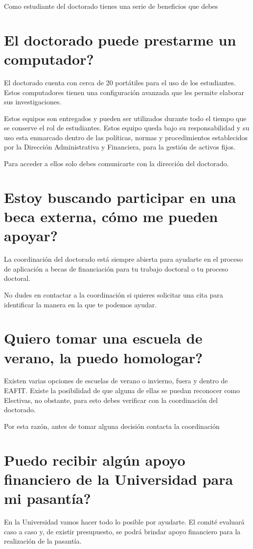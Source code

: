 Como estudiante del doctorado tienes una serie de beneficios que debes 

\section{El doctorado puede prestarme un computador?}

El doctorado cuenta con cerca de 20 portátiles para el uso de los estudiantes. Estos computadores tienen una configuración avanzada que les permite elaborar sus investigaciones.

Estos equipos son entregados y pueden ser utilizados durante todo el tiempo que se conserve el rol de estudiantes. Estos equipo queda bajo su responsabilidad y su uso esta enmarcado dentro de las políticas, normas y procedimientos establecidos por la Dirección Administrativa y Financiera, para la gestión de activos fijos. 

Para acceder a ellos solo debes comunicarte con la dirección del doctorado.

\section{Estoy buscando participar en una beca externa, cómo me pueden apoyar?}

La coordinación del doctorado está siempre abierta para ayudarte en el proceso de aplicación a becas de financiación para tu trabajo doctoral o tu proceso doctoral.

No dudes en contactar a la coordinación si quieres solicitar una cita para identificar la manera en la que te podemos ayudar.

\section{Quiero tomar una escuela de verano, la puedo homologar?}

Existen varias opciones de escuelas de verano o invierno, fuera y dentro de EAFIT. Existe la posibilidad de que alguna de ellas se puedan reconocer como Electivas, no obstante, para esto debes verificar con la coordinación del doctorado.

Por esta razón, antes de tomar alguna decisión contacta la coordinación

\section{Puedo recibir algún apoyo financiero de la Universidad para mi pasantía?}

En la Universidad vamos hacer todo lo posible por ayudarte. El comité evaluará caso a caso y, de existir presupuesto, se podrá brindar apoyo financiero para la realización de la pasantía.






